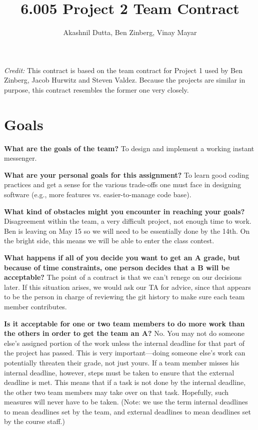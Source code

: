 \documentclass[11pt]{article}
\title{6.005 Project 2 Team Contract}
\author{Akashnil Dutta, Ben Zinberg, Vinay Mayar}
\newcommand{\question}[2]{{\noindent\bf #1}\newline #2 \newline}
\begin{document}
\maketitle

{\em Credit:} This contract is based on the team contract for Project 1 used by Ben Zinberg, Jacob Hurwitz and Steven Valdez.  Because the projects are similar in purpose, this contract resembles the former one very closely.

\section{Goals}
\question{What are the goals of the team?}{
To design and implement a working instant messenger.}

\question{What are your personal goals for this assignment?}{
To learn good coding practices and get a sense for the various trade-offs one must face in designing software (e.g., more features vs. easier-to-manage code base).}

\question{What kind of obstacles might you encounter in reaching your goals?}{
Disagreement within the team, a very difficult project, not enough time to work.  Ben is leaving on May 15 so we will need to be essentially done by the 14th.  On the bright side, this means we will be able to enter the class contest.}

\question{What happens if all of you decide you want to get an A grade, but because of time constraints, one person decides that a B will be acceptable?}{
The point of a contract is that we can't renege on our decisions later. If this situation arises, we would ask our TA for advice, since that appears to be the person in charge of reviewing the git history to make sure each team member contributes.}

\question{Is it acceptable for one or two team members to do more work than the others in order to get the team an A?}{
No.  You may not do someone else's assigned portion of the work unless the internal deadline for that part of the project has passed.  This is very important---doing someone else's work can potentially threaten their grade, not just yours.  If a team member misses his internal deadline, however, steps must be taken to ensure that the external deadline is met.  This means that if a task is not done by the internal deadline, the other two team members may take over on that task.  Hopefully, such measures will never have to be taken. (Note: we use the term internal deadlines to mean deadlines set by the team, and external deadlines to mean deadlines set by the course staff.)}
\end{document}
